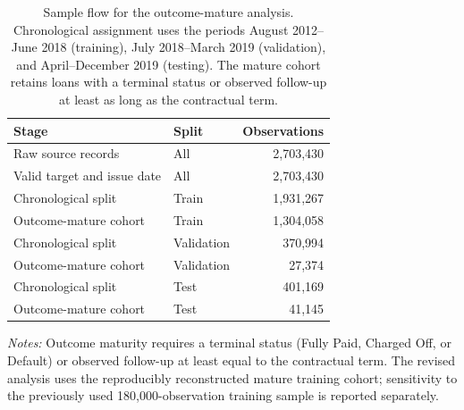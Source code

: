 \documentclass[10pt]{article}
\begin{document}
\begin{table}[!ht]
\centering
\caption{Sample flow for the outcome-mature analysis. Chronological assignment uses the periods August 2012--June 2018 (training), July 2018--March 2019 (validation), and April--December 2019 (testing). The mature cohort retains loans with a terminal status or observed follow-up at least as long as the contractual term.}
\label{tab:flow_mature}
\begin{tabular}{llr}
\toprule
Stage & Split & Observations \\
\midrule
Raw source records & All & 2,703,430 \\
Valid target and issue date & All & 2,703,430 \\
\midrule
Chronological split & Train & 1,931,267 \\
Outcome-mature cohort & Train & 1,304,058 \\
Chronological split & Validation & 370,994 \\
Outcome-mature cohort & Validation & 27,374 \\
Chronological split & Test & 401,169 \\
Outcome-mature cohort & Test & 41,145 \\
\bottomrule
\end{tabular}

\vspace{3pt}
{\footnotesize \textit{Notes:} Outcome maturity requires a terminal status (Fully Paid, Charged Off, or Default) or observed follow-up at least equal to the contractual term. The revised analysis uses the reproducibly reconstructed mature training cohort; sensitivity to the previously used 180,000-observation training sample is reported separately.}
\end{table}
\end{document}
